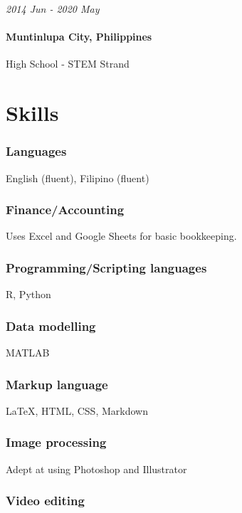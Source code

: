 \documentclass[a4paper,10pt]{article}
\newcommand{\dates}{\hfill\textit}
\begin{document}
\dates{2014 Jun - 2020 May}

\paragraph{Muntinlupa City, Philippines}

High School - STEM Strand


\section{Skills}

\subsubsection{Languages}

English (fluent), Filipino (fluent)

\subsubsection{Finance/Accounting}

Uses Excel and Google Sheets for basic bookkeeping.

\subsubsection{Programming/Scripting languages}

R, Python

\subsubsection{Data modelling}

MATLAB

\subsubsection{Markup language}

\LaTeX, HTML, CSS, Markdown

\subsubsection{Image processing}

Adept at using Photoshop and Illustrator

\subsubsection{Video editing}
\end{document}
